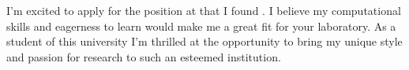 



I'm excited to apply for the \position\;position at \company\;that I found \source.
I believe my computational skills and eagerness to learn would make me a great fit for your laboratory.
As a student of this university I'm thrilled at the opportunity to bring my unique style and passion for research to such an esteemed institution.
